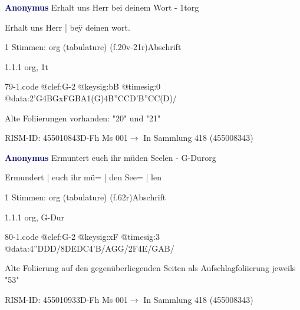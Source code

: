 \documentclass[twocolumn, 12pt]{book}
\begin{document}
\par \vspace{16pt} \textcolor{darkblue}{\textbf{Anonymus  }}\hfillplus{\textbf{[79]}}\newline Erhalt uns Herr bei deinem Wort - 1t\newline org
\par \begin{itshape}[f.20r, at left:] Erhalt uns Herr | beÿ deinen wort.\end{itshape} 
\par \textcolor{darkblue}{}  1 Stimmen: org (tabulature)  (f.20v-21r)\newline Abschrift
\par 1.1.1  org, 1t  
\begin{filecontents*}{79-1.code}
@clef:G-2
@keysig:bB
@timesig:0
@data:2'G4BGxFGBA1(G)4B''CCD'B''CC(D)/
\end{filecontents*}
\newline %
\par Alte Foliierungen vorhanden: "20" und "21"
\par RISM-ID: 455010843\newline D-Fh  Ms 001\newline $\rightarrow$ In Sammlung 418 (455008343)
      
\par \vspace{16pt} \textcolor{darkblue}{\textbf{Anonymus  }}\hfillplus{\textbf{[80]}}\newline Ermuntert euch ihr müden Seelen - G-Dur\newline org
\par \begin{itshape}[f.62r, at left:] Ermundert | euch ihr mü= | den See= | len\end{itshape} 
\par \textcolor{darkblue}{}  1 Stimmen: org (tabulature)  (f.62r)\newline Abschrift
\par 1.1.1  org, G-Dur  
\begin{filecontents*}{80-1.code}
@clef:G-2
@keysig:xF
@timesig:3
@data:4''DDD/{8DEDC}4'B/AGG/2F4E/GAB/
\end{filecontents*}
\newline %
\par Alte Foliierung auf den gegenüberliegenden Seiten als Aufschlagfoliierung jeweils "53"
\par RISM-ID: 455010933\newline D-Fh  Ms 001\newline $\rightarrow$ In Sammlung 418 (455008343)
      
\end{document}
